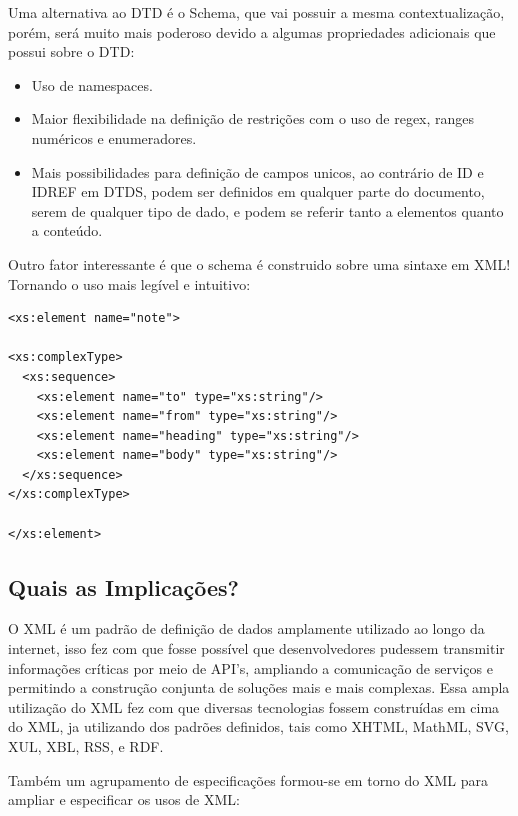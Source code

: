 Uma alternativa ao DTD é o Schema, que vai possuir a mesma contextualização, porém, será muito mais poderoso devido a algumas propriedades adicionais que possui sobre o DTD\cite{wikixmlschema}:

\begin{itemize}
  \item Uso de namespaces.
  \item Maior flexibilidade na definição de restrições com o uso de regex, ranges numéricos e enumeradores.
  \item Mais possibilidades para definição de campos unicos, ao contrário de ID e IDREF em DTDS, podem ser definidos em qualquer parte do documento, serem de qualquer tipo de dado, e podem se referir tanto a elementos quanto a conteúdo.
\end{itemize}

Outro fator interessante é que o schema é construido sobre uma sintaxe em XML! Tornando o uso mais legível e intuitivo:

\begin{verbatim}
<xs:element name="note">

<xs:complexType>
  <xs:sequence>
    <xs:element name="to" type="xs:string"/>
    <xs:element name="from" type="xs:string"/>
    <xs:element name="heading" type="xs:string"/>
    <xs:element name="body" type="xs:string"/>
  </xs:sequence>
</xs:complexType>

</xs:element> 
\end{verbatim}

\subsection{Quais as Implicações?}

O XML é um padrão de definição de dados amplamente utilizado ao longo da internet, isso fez com que fosse possível que desenvolvedores pudessem transmitir informações críticas por meio de API's, ampliando a comunicação de serviços e permitindo a construção conjunta de soluções mais e mais complexas. Essa ampla utilização do XML fez com que diversas tecnologias fossem construídas em cima do XML, ja utilizando dos padrões definidos, tais como XHTML, MathML, SVG, XUL, XBL, RSS, e RDF\cite{mozillaxml}.

Também um agrupamento de especificações formou-se em torno do XML para ampliar e especificar os usos de XML\cite{wikixml}:

